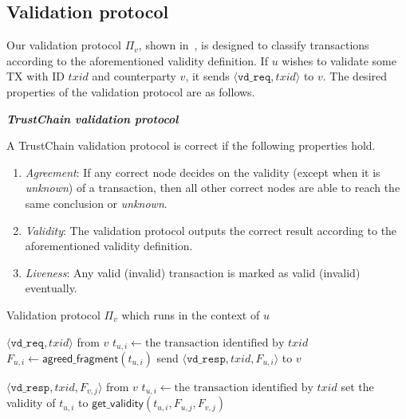 \subsection{Validation protocol}
Our validation protocol $\Pi_v$,
shown in~,
is designed to classify transactions according to the aforementioned validity definition.
If $u$ wishes to validate some TX with ID $txid$ and counterparty $v$, it sends $\langle \texttt{vd\_req}, txid \rangle$ to $v$.
The desired properties of the validation protocol are as follows.
\begin{definition}
\label{def:validation}
\textbf{\emph{TrustChain validation protocol}}

A TrustChain validation protocol is correct if the following properties hold.
\begin{enumerate}
    \item \emph{Agreement}:
        If any correct node decides on the validity (except when it is \emph{unknown}) of a transaction,
        then all other correct nodes are able to reach the same conclusion or \emph{unknown}.
    \item \emph{Validity}:
        The validation protocol outputs the correct result
        according to the aforementioned validity definition.
    \item \emph{Liveness}:
        Any valid (invalid) transaction is marked as valid (invalid) eventually.
\end{enumerate}
\end{definition}

\begin{algorithm}
\caption{Validation protocol $\Pi_v$ which runs in the context of $u$}
\label{alg:vd-proto}

\begin{algorithmic}
    \Upon $\langle \texttt{vd\_req}, txid \rangle$ from $v$
        \State $t_{u, i} \gets \text{the transaction identified by } txid$
        \State $F_{u, i} \gets \textsf{agreed\_fragment}(t_{u, i})$
        \State send $\langle \texttt{vd\_resp}, txid, F_{u, i} \rangle$ to $v$

    \Upon $\langle \texttt{vd\_resp}, txid, F_{v, j} \rangle$ from $v$
        \State $t_{u, i} \gets \text{the transaction identified by } txid$
            \State set the validity of $t_{u, i}$ to $\textsf{get\_validity}(t_{u, i}, F_{u, j}, F_{v, j})$
        \EndIf
\end{algorithmic}
\end{algorithm}

